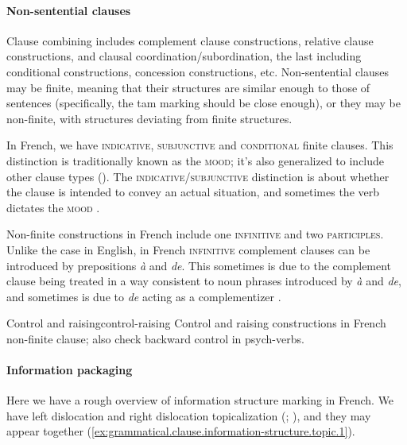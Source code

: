 \documentclass[a4paper, oneside, 12pt]{report}
\newcommand*{\citesec}[1]{\S~{#1}}
\newcommand*{\citepage}[1]{p.~{#1}}
\newcommand*{\citepages}[1]{pp.~{#1}}
\newcommand{\form}[1]{\emph{#1}}
\newcommand*{\category}[1]{\textsc{#1}}
\begin{document}
\paragraph*{Non-sentential clauses}
Clause combining includes complement clause constructions, relative clause constructions, and clausal coordination/subordination,
the last including conditional constructions, concession constructions, etc.
Non-sentential clauses may be finite, meaning that their structures are similar enough to those of sentences
(specifically, the \ac{tam} marking should be close enough),
or they may be non-finite, with structures deviating from finite structures.

In French, we have \category{indicative}, \category{subjunctive} and \category{conditional} finite clauses.
This distinction is traditionally known as the \category{mood};
it's also generalized to include other clause types ().
The \category{indicative}/\category{subjunctive} distinction
is about whether the clause is intended to convey an actual situation,
and sometimes the verb dictates the \category{mood} \citep[\citepage{753}]{l1999advanced}.

Non-finite constructions in French include one \category{infinitive} and two \category{participles}. 
Unlike the case in English, in French \category{infinitive} complement clauses
can be introduced by prepositions \form{à} and \form{de}.
This sometimes is due to the complement clause being treated in a way
consistent to noun phrases introduced by \form{à} and \form{de},
and sometimes is due to \form{de} acting as a complementizer
\citep[\citepages{158-159}]{rowlett2007syntax}.

\begin{todobox}{Control and raising}{control-raising}
    Control and raising constructions in French non-finite clause;
    also check backward control in psych-verbs.
\end{todobox}

\paragraph*{Information packaging}
Here we have a rough overview of information structure marking in French.
We have left dislocation and right dislocation topicalization
(\citealt[\citesec{5.3}]{rowlett2007syntax}; ),
and they may appear together (\ref{ex:grammatical.clause.information-structure.topic.1}).
\end{document}

